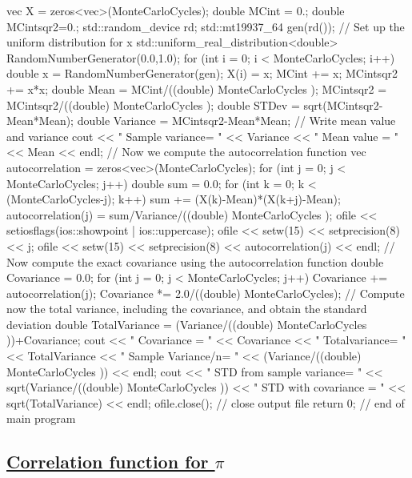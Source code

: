 \documentclass[%
oneside,                 %
final,                   %
10pt]{article}
\newenvironment{block_mdfboxadmon}[1][]{
\begin{block_mdfboxmdframed}[frametitle=#1]
}
{
\end{block_mdfboxmdframed}
}
\begin{document}
\begin{block_mdfboxadmon}[]
{  vec X  = zeros<vec>(MonteCarloCycles);
  double MCint = 0.;      double MCintsqr2=0.;
  std::random_device rd;
  std::mt19937_64 gen(rd());
  // Set up the uniform distribution for x \in [[0, 1]
  std::uniform_real_distribution<double> RandomNumberGenerator(0.0,1.0);
  for (int i = 0;  i < MonteCarloCycles; i++){
    double x =   RandomNumberGenerator(gen); 
    X(i) = x;
    MCint += x;
    MCintsqr2 += x*x;
  }
  double Mean = MCint/((double) MonteCarloCycles );
  MCintsqr2 = MCintsqr2/((double) MonteCarloCycles );
  double STDev = sqrt(MCintsqr2-Mean*Mean);
  double Variance = MCintsqr2-Mean*Mean;
  //   Write mean value and variance
  cout << " Sample variance= " << Variance  << " Mean value = " << Mean << endl;
  // Now we compute the autocorrelation function
  vec autocorrelation = zeros<vec>(MonteCarloCycles);
  for (int j = 0; j < MonteCarloCycles; j++){
    double sum = 0.0;
    for (int k = 0; k < (MonteCarloCycles-j); k++){
      sum  += (X(k)-Mean)*(X(k+j)-Mean); 
    }
    autocorrelation(j) = sum/Variance/((double) MonteCarloCycles );
    ofile << setiosflags(ios::showpoint | ios::uppercase);
    ofile << setw(15) << setprecision(8) << j;
    ofile << setw(15) << setprecision(8) << autocorrelation(j) << endl;
  }
  // Now compute the exact covariance using the autocorrelation function
  double Covariance = 0.0;
  for (int j = 0; j < MonteCarloCycles; j++){
    Covariance  += autocorrelation(j);
  }
  Covariance *=  2.0/((double) MonteCarloCycles);
  // Compute now the total variance, including the covariance, and obtain the standard deviation
  double TotalVariance = (Variance/((double) MonteCarloCycles ))+Covariance;
  cout << " Covariance = " << Covariance << " Totalvariance= " << TotalVariance << " Sample Variance/n= " << (Variance/((double) MonteCarloCycles )) << endl;
  cout << " STD from sample variance= " << sqrt(Variance/((double) MonteCarloCycles )) << " STD with covariance = " << sqrt(TotalVariance) << endl;
  ofile.close();  // close output file
  return 0;
}  // end of main program 
\ecppcod
\end{block_mdfboxadmon} %




\subsection{\href{{https://github.com/CompPhysics/ComputationalPhysicsMSU/blob/master/doc/Programs/LecturePrograms/programs/MCIntro/cpp/program7.cpp}}{Correlation function for $\pi$}}
\end{document}
